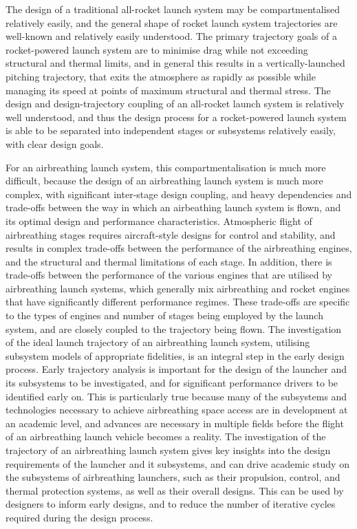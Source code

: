     The design of a traditional all-rocket launch system may be compartmentalised relatively easily, and the general shape of rocket launch system trajectories are well-known and relatively easily understood.  The primary trajectory goals of a rocket-powered launch system are to minimise drag while not exceeding structural and thermal limits, and in general this results in a vertically-launched pitching trajectory, that exits the atmosphere as rapidly as possible while managing its speed at points of maximum structural and thermal stress. The design and design-trajectory coupling of an all-rocket launch system is relatively well understood, and thus the design process for a rocket-powered launch system is able to be separated into independent stages or subsystems relatively easily, with clear design goals. 
    
   
    
    For an airbreathing launch system, this compartmentalisation is much more difficult, because the design of an airbreathing launch system is much more complex, with significant inter-stage design coupling, and heavy dependencies and trade-offs between the way in which an airbeathing launch system is flown, and its optimal design and performance characteristics. Atmospheric flight of airbreathing stages requires aircraft-style designs for control and stability, and results in complex trade-offs between the performance of the airbreathing engines, and the structural and thermal limitations of each stage. In addition, there is trade-offs between the performance of the various engines that are utilised by airbreathing launch systems, which generally mix airbreathing and rocket engines that have significantly different performance regimes.
    These trade-offs are specific to the types of engines and number of stages being employed by the launch system, and are closely coupled to the trajectory being flown. The investigation of the ideal launch trajectory of an airbreathing launch system, utilising subsystem models of appropriate fidelities, is an integral step in the early design process. Early trajectory analysis is important for the design of the launcher and its subsystems to be investigated, and for significant performance drivers to be identified early on. 
  This is particularly true because many of the subsystems and technologies necessary to achieve airbreathing space access are in development at an academic level, and advances are necessary in multiple fields before the flight of an airbreathing launch vehicle becomes a reality. The investigation of the trajectory of an airbreathing launch system gives key insights into the design requirements of the launcher and it subsystems, and can drive academic study on the subsystems of airbreathing launchers, such as their propulsion, control, and thermal protection systems, as well as their overall designs. This can be used by designers to inform early designs, and to reduce the number of iterative cycles required during the design process. 
    
  